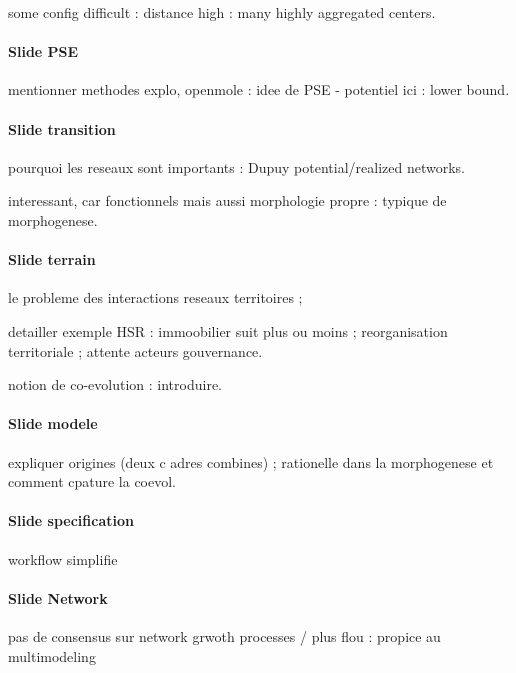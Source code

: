 \documentclass[11pt]{article}
\begin{document}
some config difficult : distance high : many highly aggregated centers.



\paragraph{Slide PSE}

mentionner methodes explo, openmole : idee de PSE - potentiel ici : lower bound.



\paragraph{Slide transition}

pourquoi les reseaux sont importants : Dupuy potential/realized networks.

interessant, car fonctionnels mais aussi morphologie propre : typique de morphogenese.


\paragraph{Slide terrain}

le probleme des interactions reseaux territoires ;

detailler exemple HSR : immoobilier suit plus ou moins ; reorganisation territoriale ; attente acteurs gouvernance.

notion de co-evolution : introduire.


\paragraph{Slide modele}

expliquer origines (deux c adres combines) ; rationelle dans la morphogenese et comment cpature la coevol.



\paragraph{Slide specification}

workflow simplifie

\paragraph{Slide Network}

pas de consensus sur network grwoth processes / plus flou : propice au multimodeling
\end{document}
